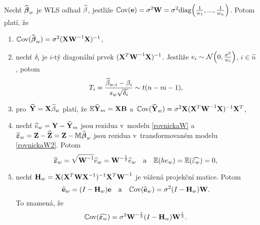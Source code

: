 \begin{theorem}
Nechť $\widehat{\boldsymbol{\beta}}_w$ je WLS odhad $\widehat{\beta}$, jestliže $\mathbb{C}\mathrm{ov}(\mathbf{e}) = \sigma^2\textbf{W} = \sigma^2\mathrm{diag}\Big(\frac{1}{w_1},...,\frac{1}{w_n}\Big)$. Potom platí, že
\begin{enumerate}[1)]
	\item $\mathbb{C}\mathrm{ov}(\widehat{\boldsymbol{\beta}}_w) = \sigma^2{(\mathbf{X}{\textbf{W}^{-1}}\mathbf{X})^{-1}}$,
	\item nechť $\delta_i$ je $i$-tý diagonální prvek ${(\mathbf{X}^T{\textbf{W}^{-1}}\mathbf{X})^{-1}}$. Jestliže $e_i\sim \mathcal{N}\Big(0,\frac{\sigma^2}{w_i}\Big)$, $i\in\widehat{n}$, potom
	 $$ T_i = \frac{\widehat{\beta}_{w,i}-\beta_i}{s_w\sqrt{\delta_i}}\sim t(n-m-1), $$
	\item pro~$\widehat{\mathbf{Y}} = \mathbf{X}\widehat{\beta}_w$ platí, že $\mathbb{E} \widehat{\mathbf{Y}}_m = \mathbf{X}\textbf{B}$ a~$\mathbb{C}\mathrm{ov}(\widehat{\mathbf{Y}}_w) = \sigma^2\mathbf{X}{(\mathbf{X}^T{\textbf{W}^{-1}}\mathbf{X})^{-1}}\mathbf{X}^T$,
\item nechť $\widehat{e}_w = \mathbf{Y}-\widehat{\mathbf{Y}}_m$ jsou rezidua v~modelu \ref{rovnickaW} a~$\widehat{\boldsymbol{\varepsilon}}_w = \textbf{Z}-\widehat{\textbf{Z}} = \textbf{Z}-\mathbb{M}\widehat{\boldsymbol{\beta}}_w$ jsou rezidua v~transformovaném modelu \ref{rovnickaW2}. Potom
 $$ \widehat{\boldsymbol{\varepsilon}}_w = \sqrt{{\textbf{W}^{-1}}}\widehat{e}_w = \textbf{W}^{-\frac{1}{2}}\widehat{e}_w\quad\text{a}\quad \mathbb{E}(he_w) = \mathbb{E}(\widehat{\varepsilon_w}) = 0, $$
\item nechť $\textbf{H}_w = \mathbf{X}{(\mathbf{X}^T{\textbf{W}\mathbf{X}^{-1}})^{-1}}\mathbf{X}^T{\textbf{W}^{-1}}$ je vážená projekční matice. Potom
 $$ \widehat{\mathbf{e}}_w = (I-\textbf{H}_w)\mathbf{e}\quad\text{a}\quad \mathbb{C}\mathrm{ov}(\widehat{\mathbf{e}}_w) = \sigma^2(I-\textbf{H}_w)\textbf{W}. $$
To znamená, že $$ \mathbb{C}\mathrm{ov}(\widehat{\boldsymbol{\varepsilon}_w}) = \sigma^2\textbf{W}^{-\frac{1}{2}}(I-\textbf{H}_w)\textbf{W}^{\frac{1}{2}}. $$
\end{enumerate}


\end{theorem}

